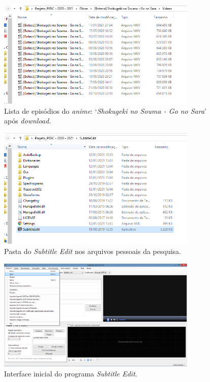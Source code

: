 \documentclass[portuguese]{textolivre}
\begin{document}
\begin{figure}[htbp]
 \centering
 \includegraphics[width=0.85\textwidth]{Fig2.png}
 \caption{Lista de episódios do \textit{anime}: ‘\textit{Shokugeki no Souma - Go no Sara}’ após \textit{download}.}
 \label{fig02}
\end{figure}

\begin{figure}[htbp]
 \centering
 \includegraphics[width=0.85\textwidth]{Fig3.png}
 \caption{Pasta do \textit{Subtitle Edit} nos arquivos pessoais da pesquisa.}
 \label{fig03}
\end{figure}

\begin{figure}[htbp]
 \centering
 \includegraphics[width=0.85\textwidth]{Fig4.png}
 \caption{Interface inicial do programa \textit{Subtitle Edit}.}
 \label{fig04}
\end{figure}
\end{document}
